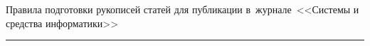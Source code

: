 \def\stat{prav-rus}


{%


\vspace*{-25pt} %


\raggedleft\large \bf%


Правила подготовки рукописей статей для публикации в~журнале~<<Системы и средства информатики>>




\vskip 5pt


    \hrule


    \par




}





\def\rightmark{\ }


\def\leftmark{\ }





\def\tit{\ }





\def\aut{\ }





\def\auf{\ }





\def\leftkol{\ } %





\def\rightkol{\ } %





\titele{\tit}{\aut}{\auf}{\leftkol}{\rightkol}





\vspace*{-58pt}


